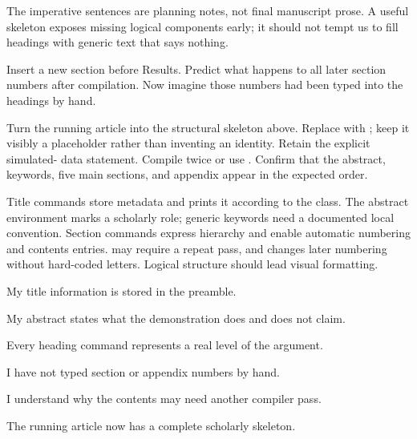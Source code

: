 The imperative sentences are planning notes, not final manuscript prose. A
useful skeleton exposes missing logical components early; it should not tempt
us to fill headings with generic text that says nothing.

\begin{pausepredict}
Insert a new section before Results. Predict what happens to all later section
numbers after compilation. Now imagine those numbers had been typed into the
headings by hand.
\end{pausepredict}

\chapterproject

\begin{miniproject}
Turn the running article into the structural skeleton above. Replace
 with ; keep it visibly a
placeholder rather than inventing an identity. Retain the explicit simulated-
data statement. Compile twice or use . Confirm that the abstract,
keywords, five main sections, and appendix appear in the expected order.
\end{miniproject}

\chaptersummary

Title commands store metadata and  prints it according to the
class. The abstract environment marks a scholarly role; generic keywords need
a documented local convention. Section commands express hierarchy and enable
automatic numbering and contents entries.  may require a
repeat pass, and  changes later numbering without hard-coded
letters. Logical structure should lead visual formatting.

\chaptercheck
\begin{chapterchecklist}
  \item My title information is stored in the preamble.
  \item My abstract states what the demonstration does and does not claim.
  \item Every heading command represents a real level of the argument.
  \item I have not typed section or appendix numbers by hand.
  \item I understand why the contents may need another compiler pass.
  \item The running article now has a complete scholarly skeleton.
\end{chapterchecklist}

